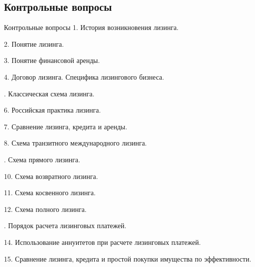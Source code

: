 \documentclass[_Banking_p3.tex]{subfiles}
\begin{document}
\subsection{Контрольные вопросы}
\begin{frame}[ allowframebreaks ]{Контрольные вопросы}
1. История возникновения лизинга.

2. Понятие лизинга.

3. Понятие финансовой аренды.

4. Договор лизинга. Специфика лизингового бизнеса.

. Классическая схема лизинга.

6. Российская практика лизинга.

7. Сравнение лизинга, кредита и аренды.

8. Схема транзитного международного лизинга.

. Схема прямого лизинга.

10. Схема возвратного лизинга.

11. Схема косвенного лизинга.

12. Схема полного лизинга.

. Порядок расчета лизинговых платежей.

14. Использование аннуитетов при расчете лизинговых платежей.

15. Сравнение лизинга, кредита и простой покупки имущества по эффективности.
\end{frame}
\end{document}
